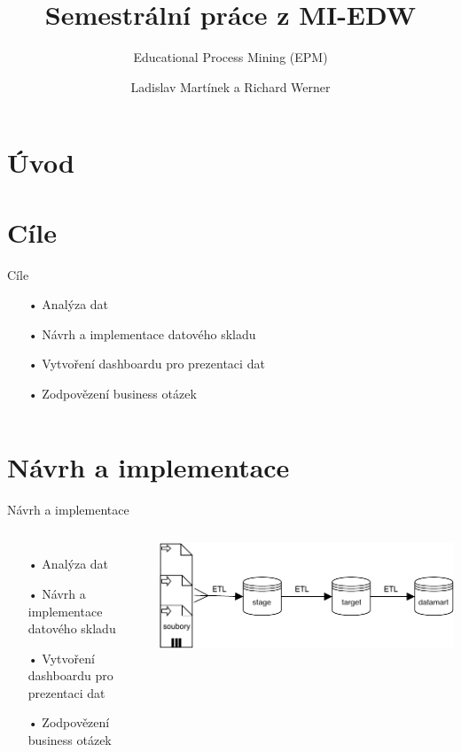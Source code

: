 \documentclass[aspectratio=169,28pt]{beamer}
\title{Semestrální práce z MI-EDW}
\subtitle{Educational Process Mining (EPM)}
\author{Ladislav Martínek a Richard Werner}
\institute[\FacultyAndUniversityAbbr]{\Department\\ \Faculty\\ \University}
\date {}
\begin{document}
\section{Úvod}
\begin{frame}
\titlepage
\end{frame}

\section{Cíle}
\begin{frame}{Cíle}
\begin{itemize}
        \item[•] Analýza dat
		\item[•] Návrh a implementace datového skladu
		\item[•] Vytvoření dashboardu pro prezentaci dat
		\item[•] Zodpovězení business otázek
		\end{itemize}
\begin{columns}[c]
    \column{5cm}
    \column{10cm}
 \end{columns}   
      
\end{frame}

\section{Návrh a implementace}
\begin{frame}{Návrh a implementace}
		\begin{columns}[c]
    \column{8cm}
    \begin{itemize}
        \item[•] Analýza dat
		\item[•] Návrh a implementace datového skladu
		\item[•] Vytvoření dashboardu pro prezentaci dat
		\item[•] Zodpovězení business otázek
		\end{itemize}
    \column{7cm}
    \includegraphics[scale=0.58]{img/DW}
 \end{columns}   
\end{frame}
\end{document}
